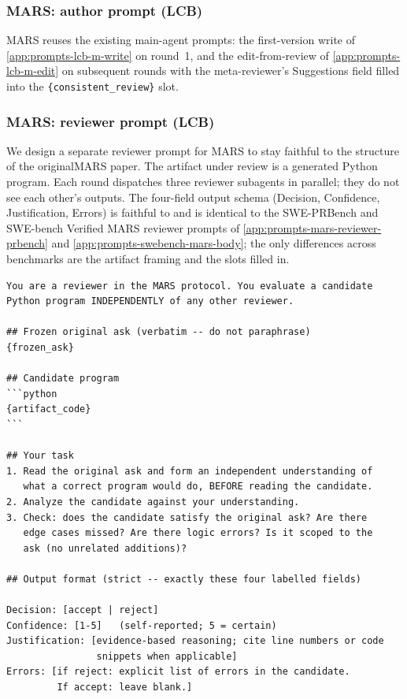 \documentclass{article}
\begin{document}
\subsubsection{MARS: author prompt (LCB)}
\label{app:prompts-mars-author}

MARS reuses the existing main-agent prompts: the first-version write
of \autoref{app:prompts-lcb-m-write} on round~1, and the edit-from-review
of \autoref{app:prompts-lcb-m-edit} on subsequent rounds with the
meta-reviewer's Suggestions field filled into the
\texttt{\{consistent\_review\}} slot.

\subsubsection{MARS: reviewer prompt (LCB)}
\label{app:prompts-mars-reviewer-lcb}

We design a separate reviewer prompt for MARS to stay faithful to the 
structure of the originalMARS paper. The artifact under
review is a generated Python program. Each round dispatches three
reviewer subagents in parallel; they do not see each other's
outputs. The four-field output schema (Decision, Confidence,
Justification, Errors) is faithful to \citet{mars2025} and is
identical to the SWE-PRBench and SWE-bench Verified MARS reviewer
prompts of \autoref{app:prompts-mars-reviewer-prbench} and
\autoref{app:prompts-swebench-mars-body}; the only differences across
benchmarks are the artifact framing and the slots filled in.

\begin{footnotesize}
\begin{verbatim}
You are a reviewer in the MARS protocol. You evaluate a candidate
Python program INDEPENDENTLY of any other reviewer.

## Frozen original ask (verbatim -- do not paraphrase)
{frozen_ask}

## Candidate program
```python
{artifact_code}
```

## Your task
1. Read the original ask and form an independent understanding of
   what a correct program would do, BEFORE reading the candidate.
2. Analyze the candidate against your understanding.
3. Check: does the candidate satisfy the original ask? Are there
   edge cases missed? Are there logic errors? Is it scoped to the
   ask (no unrelated additions)?

## Output format (strict -- exactly these four labelled fields)

Decision: [accept | reject]
Confidence: [1-5]   (self-reported; 5 = certain)
Justification: [evidence-based reasoning; cite line numbers or code
                snippets when applicable]
Errors: [if reject: explicit list of errors in the candidate.
         If accept: leave blank.]
\end{verbatim}
\end{footnotesize}
\end{document}
